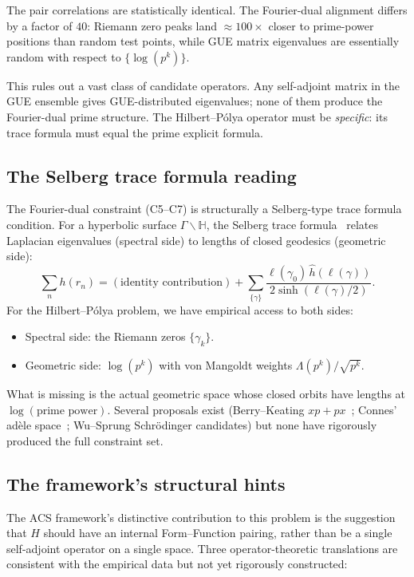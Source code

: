 \documentclass[11pt,a4paper]{article}
\theoremstyle{plain}
\theoremstyle{definition}
\theoremstyle{remark}
\begin{document}
The pair correlations are statistically identical. The Fourier-dual
alignment differs by a factor of $40$: Riemann zero peaks land
$\approx 100\times$ closer to prime-power positions than random
test points, while GUE matrix eigenvalues are essentially random
with respect to $\{\log(p^k)\}$.

This rules out a vast class of candidate operators. Any self-adjoint
matrix in the GUE ensemble gives GUE-distributed eigenvalues; none
of them produce the Fourier-dual prime structure. The Hilbert--Pólya
operator must be \emph{specific}: its trace formula must equal the
prime explicit formula.

\subsection{The Selberg trace formula reading}
\label{sec:hp-selberg}

The Fourier-dual constraint (C5--C7) is structurally a Selberg-type
trace formula condition. For a hyperbolic surface $\Gamma \backslash \mathbb{H}$,
the Selberg trace formula~\cite{Selberg1956} relates Laplacian
eigenvalues (spectral side) to lengths of closed geodesics (geometric side):
\begin{equation}
  \sum_{n} h(r_n) = (\text{identity contribution}) + \sum_{\{\gamma\}}
  \frac{\ell(\gamma_0) \, \hat{h}(\ell(\gamma))}{2 \sinh(\ell(\gamma)/2)}.
\end{equation}
For the Hilbert--Pólya problem, we have empirical access to both sides:
\begin{itemize}
\item Spectral side: the Riemann zeros $\{\gamma_k\}$.
\item Geometric side: $\log(p^k)$ with von Mangoldt weights $\Lambda(p^k)/\sqrt{p^k}$.
\end{itemize}
What is missing is the actual geometric space whose closed orbits
have lengths at $\log(\text{prime power})$. Several proposals exist
(Berry--Keating $xp+px$~\cite{BerryKeating1999}; Connes' adèle space~\cite{Connes1999};
Wu--Sprung Schrödinger candidates) but none have rigorously produced
the full constraint set.

\subsection{The framework's structural hints}
\label{sec:hp-acs-hints}

The ACS framework's distinctive contribution to this problem is the
suggestion that $H$ should have an internal Form--Function pairing,
rather than be a single self-adjoint operator on a single space.
Three operator-theoretic translations are consistent with the empirical
data but not yet rigorously constructed:
\end{document}
